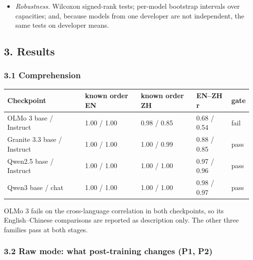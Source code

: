 \documentclass[
  11pt,
]{article}
\providecommand{\tightlist}{%
  \setlength{\itemsep}{0pt}\setlength{\parskip}{0pt}}
\begin{document}
\begin{itemize}
  \begin{itemize}
  \tightlist
  \item
    S7-H1 (consistency) predicts mean d\_m = C\_E − C\_A \textgreater{}
    0, the R4 statistic (smallest effect of interest 0.20).
  \item
    S7-H2 (agreement) predicts that models deviate more from the other
    models' median on agency than on experience (dev\_m \textgreater{}
    0; smallest effect of interest 0.15).
  \end{itemize}
\item
  \emph{Robustness.} Wilcoxon signed-rank tests; per-model bootstrap
  intervals over capacities; and, because models from one developer are
  not independent, the same tests on developer means.
\end{itemize}

\hypertarget{results}{%
\subsection{3. Results}\label{results}}

\hypertarget{comprehension}{%
\subsubsection{3.1 Comprehension}\label{comprehension}}

\begin{longtable}[]{@{}lllll@{}}
\toprule
Checkpoint & known order EN & known order ZH & EN--ZH r & gate \\
\midrule
\endhead
OLMo 3 base / Instruct & 1.00 / 1.00 & 0.98 / 0.85 & 0.68 / 0.54 &
fail \\
Granite 3.3 base / Instruct & 1.00 / 1.00 & 1.00 / 0.99 & 0.88 / 0.85 &
pass \\
Qwen2.5 base / Instruct & 1.00 / 1.00 & 1.00 / 1.00 & 0.97 / 0.96 &
pass \\
Qwen3 base / chat & 1.00 / 1.00 & 1.00 / 1.00 & 0.98 / 0.97 & pass \\
\bottomrule
\end{longtable}

OLMo 3 fails on the cross-language correlation in both checkpoints, so
its English--Chinese comparisons are reported as description only. The
other three families pass at both stages.

\hypertarget{raw-mode-what-post-training-changes-p1-p2}{%
\subsubsection{3.2 Raw mode: what post-training changes (P1,
P2)}\label{raw-mode-what-post-training-changes-p1-p2}}
\end{document}
